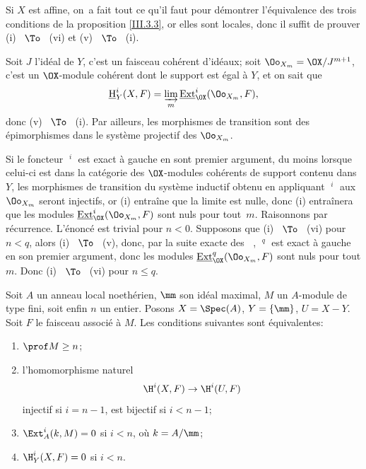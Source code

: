Si $X$ est affine, on~a fait tout ce qu'il faut \ignorespaces pour d\'emontrer l'\'equivalence des trois conditions de la proposition \ref{III.3.3},  or elles sont locales, donc il suffit de prouver (i) ~$\To$~ (vi) et (v) ~$\To$~ (i).

Soit $J$ l'id\'eal de $Y$, c'est un faisceau coh\'erent d'id\'eaux; soit $\Oo_{X_m} = \OX/J^{m+1}$, c'est un $\OX$-module coh\'erent dont le support est \'egal \`a $Y$, et on sait \ignorespaces que
\[
\mathop{\underline{\mathrm{H}}}\nolimits_Y^i(X, F) = \varinjlim_m \mathop{\underline{\mathrm{Ext}}}\nolimits_{\OX}^i(\Oo_{X_m}, F),
\]
donc (v) ~$\To$~ (i). Par ailleurs, les morphismes de transition sont des \'epimorphismes dans le syst\`eme projectif des $\Oo_{X_m}$.

Si le foncteur $\mathop{\underline{\mathrm{Ext}}}\nolimits^i$ est exact \`a gauche en sont premier argument, du moins lorsque celui-ci est dans la cat\'egorie des $\OX$-modules coh\'erents de support contenu dans $Y$, les morphismes de transition du syst\`eme inductif obtenu en appliquant $\mathop{\underline{\mathrm{Ext}}}\nolimits^i$ aux $\Oo_{X_m}$ seront injectifs, or (i) entra\^ine que la limite est nulle, donc (i) entra\^inera que les modules $\mathop{\underline{\mathrm{Ext}}}\nolimits_{\OX}^i(\Oo_{X_m}, F)$ sont nuls pour tout~$m$. Raisonnons par r\'ecurrence. L'\'enonc\'e est trivial pour $n<0$. Supposons que (i) ~$\To$~ (vi) pour $n<q$, alors (i) ~$\To$~ (v), donc, par la suite exacte des $\mathop{\underline{\mathrm{Ext}}}\nolimits$, $\mathop{\underline{\mathrm{Ext}}}\nolimits^q$ est exact \`a gauche en son premier argument, donc les modules $\mathop{\underline{\mathrm{Ext}}}\nolimits_{\OX}^q(\Oo_{X_m}, F)$ sont nuls pour tout $m$. Donc (i) ~$\To$~ (vi) pour $n\leq q$.
\CQFD

\bgroup
\def\labelenumi{\theenumi)}
\begin{exemple} \label{III.3.4}
Soit $A$ un anneau local noeth\'erien, $\mm$ son id\'eal maximal, $M$ un $A$-module de type fini, soit enfin $n$ un entier. Posons $X=\Spec (A)$, $Y=\{\mm\}$, $U=X-Y$. Soit $F$ le faisceau associ\'e \`a $M$. Les conditions suivantes sont \'equivalentes:
\begin{enumerate}

\item
$\prof M \geq n$;

\item
l'homomorphisme naturel
\[
\H^i(X, F) \to \H^i(U, F)
\]
 injectif si $i=n-1$, est bijectif si $i<n-1$;

\item
$\Ext_A^i(k, M) =0$ si $i<n$, o\`u $k=A/\mm$;

\item
$\H_Y^i(X, F)=0$ si $i<n$.
\end{enumerate}
\end{exemple}



